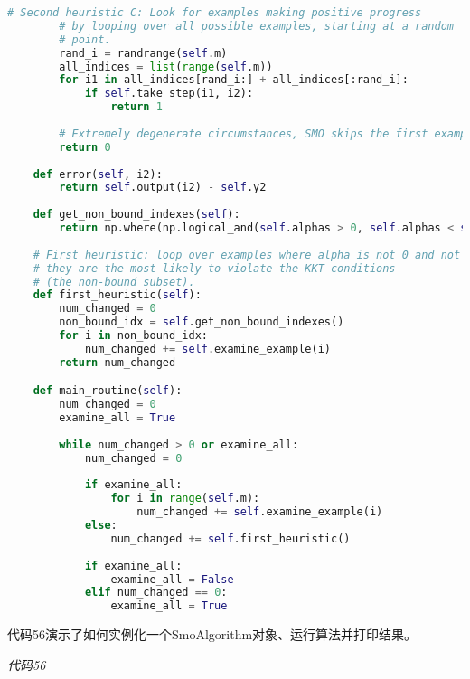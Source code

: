 \begin{lstlisting}[language=python]
        # Second heuristic C: Look for examples making positive progress 
        # by looping over all possible examples, starting at a random 
        # point. 
        rand_i = randrange(self.m) 
        all_indices = list(range(self.m)) 
        for i1 in all_indices[rand_i:] + all_indices[:rand_i]: 
            if self.take_step(i1, i2): 
                return 1 
                
        # Extremely degenerate circumstances, SMO skips the first example. 
        return 0 
    
    def error(self, i2): 
        return self.output(i2) - self.y2 
        
    def get_non_bound_indexes(self): 
        return np.where(np.logical_and(self.alphas > 0, self.alphas < self.C))[0] 
        
    # First heuristic: loop over examples where alpha is not 0 and not C 
    # they are the most likely to violate the KKT conditions 
    # (the non-bound subset). 
    def first_heuristic(self): 
        num_changed = 0 
        non_bound_idx = self.get_non_bound_indexes() 
        for i in non_bound_idx: 
            num_changed += self.examine_example(i) 
        return num_changed

    def main_routine(self): 
        num_changed = 0 
        examine_all = True 
        
        while num_changed > 0 or examine_all: 
            num_changed = 0 
            
            if examine_all: 
                for i in range(self.m): 
                    num_changed += self.examine_example(i) 
            else: 
                num_changed += self.first_heuristic() 
            
            if examine_all: 
                examine_all = False 
            elif num_changed == 0: 
                examine_all = True
\end{lstlisting}

代码56演示了如何实例化一个SmoAlgorithm对象、运行算法并打印结果。

\emph{代码56}

